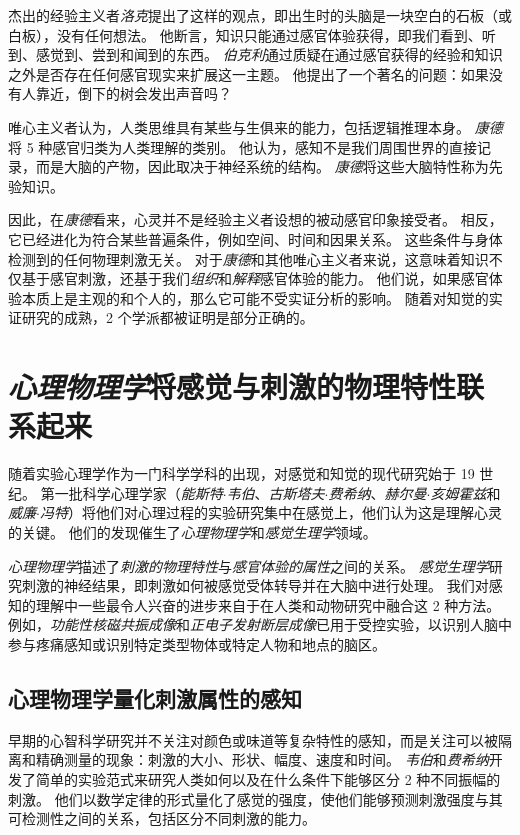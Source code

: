 杰出的经验主义者\textit{洛克}提出了这样的观点，即出生时的头脑是一块空白的石板（或白板），没有任何想法。
他断言，知识只能通过感官体验获得，即我们看到、听到、感觉到、尝到和闻到的东西。
\textit{伯克利}通过质疑在通过感官获得的经验和知识之外是否存在任何感官现实来扩展这一主题。
他提出了一个著名的问题：如果没有人靠近，倒下的树会发出声音吗？


唯心主义者认为，人类思维具有某些与生俱来的能力，包括逻辑推理本身。
\textit{康德}将 5 种感官归类为人类理解的类别。
他认为，感知不是我们周围世界的直接记录，而是大脑的产物，因此取决于神经系统的结构。
\textit{康德}将这些大脑特性称为先验知识。


因此，在\textit{康德}看来，心灵并不是经验主义者设想的被动感官印象接受者。
相反，它已经进化为符合某些普遍条件，例如空间、时间和因果关系。
这些条件与身体检测到的任何物理刺激无关。 
对于\textit{康德}和其他唯心主义者来说，这意味着知识不仅基于感官刺激，还基于我们\textit{组织}和\textit{解释}感官体验的能力。
他们说，如果感官体验本质上是主观的和个人的，那么它可能不受实证分析的影响。
随着对知觉的实证研究的成熟，2 个学派都被证明是部分正确的。



\section{\textit{心理物理学}将感觉与刺激的物理特性联系起来}

随着实验心理学作为一门科学学科的出现，对感觉和知觉的现代研究始于 19 世纪。
第一批科学心理学家（\textit{能斯特$\cdot$韦伯}、\textit{古斯塔夫$\cdot$费希纳}、\textit{赫尔曼$\cdot$亥姆霍兹}和\textit{威廉$\cdot$冯特}）将他们对心理过程的实验研究集中在感觉上，他们认为这是理解心灵的关键。
他们的发现催生了\textit{心理物理学}和\textit{感觉生理学}领域。


\textit{心理物理学}描述了\textit{刺激的物理特性}与\textit{感官体验的属性}之间的关系。 
\textit{感觉生理学}研究刺激的神经结果，即刺激如何被感觉受体转导并在大脑中进行处理。
我们对感知的理解中一些最令人兴奋的进步来自于在人类和动物研究中融合这 2 种方法。
例如，\textit{功能性核磁共振成像}和\textit{正电子发射断层成像}已用于受控实验，以识别人脑中参与疼痛感知或识别特定类型物体或特定人物和地点的脑区。


\subsection{心理物理学量化刺激属性的感知}

早期的心智科学研究并不关注对颜色或味道等复杂特性的感知，而是关注可以被隔离和精确测量的现象：刺激的大小、形状、幅度、速度和时间。
\textit{韦伯}和\textit{费希纳}开发了简单的实验范式来研究人类如何以及在什么条件下能够区分 2 种不同振幅的刺激。
他们以数学定律的形式量化了感觉的强度，使他们能够预测刺激强度与其可检测性之间的关系，包括区分不同刺激的能力。


